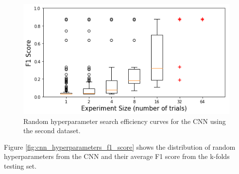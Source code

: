 \begin{figure}[H]
	\centering
	\includegraphics[width=0.8\linewidth]{images/random_hp_search_cnn_full}
	\caption{Random hyperparameter search efficiency curves for the CNN using the second dataset.}
	\label{fig:random_hp_search_cnn_full}
\end{figure}





Figure \ref{fig:cnn_hyperparameters_f1_score} shows the distribution of random hyperparameters from the CNN and their average F1 score from the k-folds testing set. 



